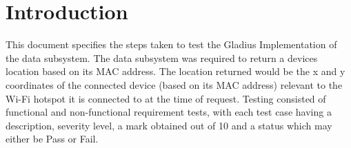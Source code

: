 \section{Introduction}
This document specifies the steps taken to test the Gladius Implementation of the data subsystem. The data subsystem was required to return a devices location based on its MAC address. The location returned would be the x and y coordinates of the connected device (based on its MAC address) relevant to the Wi-Fi hotspot it is connected to at the time of request. Testing consisted of functional and non-functional requirement tests, with each test case having a description, severity level, a mark obtained out of 10 and a status which may either be Pass or Fail.

